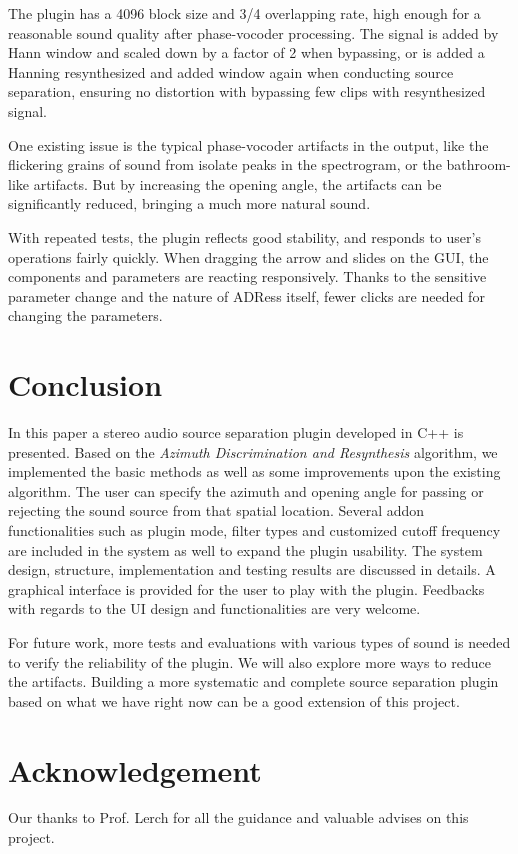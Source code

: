 \documentclass{sig-alternate}
\begin{document}
The plugin has a 4096 block size and 3/4 overlapping rate, high enough for a reasonable sound quality after phase-vocoder processing. The signal is added by Hann window and scaled down by a factor of 2 when bypassing, or is added a Hanning resynthesized and added window again when conducting source separation, ensuring no distortion with bypassing few clips with resynthesized signal. 

One existing issue is the typical phase-vocoder artifacts in the output, like the flickering grains of sound from isolate peaks in the spectrogram, or the bathroom-like artifacts. But by increasing the opening angle, the artifacts can be significantly reduced, bringing a much more natural sound.
     
With repeated tests, the plugin reflects good stability, and responds to user's operations fairly quickly. When dragging the arrow and slides on the GUI, the components and parameters are reacting responsively. Thanks to the sensitive parameter change and the nature of ADRess itself, fewer clicks are needed for changing the parameters.


\section{Conclusion}\label{sec:conclusion}

In this paper a stereo audio source separation plugin developed in C++ is presented. Based on the \textsl{Azimuth Discrimination and Resynthesis} algorithm, we implemented the basic methods as well as some improvements upon the existing algorithm. The user can specify the azimuth and opening angle for passing or rejecting the sound source from that spatial location. Several addon functionalities such as plugin mode, filter types and customized cutoff frequency are included in the system as well to expand the plugin usability. The system design, structure, implementation and testing results are discussed in details. A graphical interface is provided for the user to play with the plugin. Feedbacks with regards to the UI design and functionalities are very welcome.

For future work, more tests and evaluations with various types of sound is needed to verify the reliability of the plugin. We will also explore more ways to reduce the artifacts. Building a more systematic and complete source separation plugin based on what we have right now can be a good extension of this project.


\section{Acknowledgement}\label{sec:acknowledgement}
Our thanks to Prof. Lerch for all the guidance and valuable advises on this project.
\end{document}
